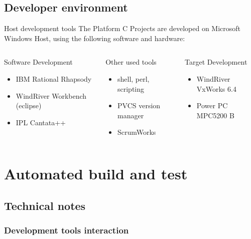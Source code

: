 \documentclass{beamer}
\begin{document}
\subsection[Developer environment]{Developer environment}
\begin{frame}{Host development tools}
The Platform C Projects are developed on Microsoft Windows Host, using the
following software and hardware:
\begin{columns}
	\begin{block}{Software Development}
	\begin{itemize}
		\item<1-> IBM Rational Rhapsody
  		\item<2-> WindRiver Workbench (eclipse) 
  		\item<3-> IPL Cantata++
    \end{itemize}
    \end{block}

	\begin{block}{Other used tools}
	\begin{itemize}
      \item<4-> shell, perl, scripting
      \item<5-> PVCS version manager
      \item<6-> ScrumWorks 
    \end{itemize}
    \end{block}

	\begin{block}{Target Development}
	\begin{itemize}
      \item<7->WindRiver VxWorks 6.4
  	  \item<8-> Power PC MPC5200 B
    \end{itemize}
    \end{block}
\end{columns}
\end{frame}

\section[Automated build and test]{Automated build and test}
\subsection[Technical notes]{Technical notes}

\begin{frame}
\frametitle{Development tools interaction}
\centering
{}
\end{frame}
\end{document}
